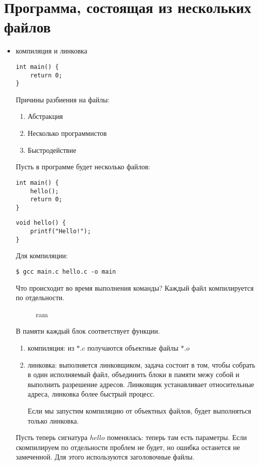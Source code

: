 % 
% 

\section{Программа, состоящая из нескольких файлов}
\begin{itemize}
    \item компиляция и линковка
\begin{lstlisting}[label=some-code,caption={main.c}]
int main() {
    return 0;
}
\end{lstlisting}
Причины разбиения на файлы:
\begin{enumerate}[noitemsep]
    \item Абстракция
    \item Несколько программистов
    \item Быстродействие
\end{enumerate}
 Пусть в программе будет несколько файлов:
\begin{lstlisting}[label=some-code,caption={main.c}]
int main() {
    hello();
    return 0;
}
\end{lstlisting}
\begin{lstlisting}[label=some-code,caption={hello.c}]
void hello() {
    printf("Hello!");
}
\end{lstlisting}
Для компиляции:
\begin{verbatim}
$ gcc main.c hello.c -o main
\end{verbatim}
Что происходит во время выполнения команды? Каждый файл компилируется по отдельности.
\begin{figure}[ht]
    \centering
    \caption{ram}
    \label{fig:ram}
\end{figure}
В памяти каждый блок соответствует функции.
\begin{enumerate}
    \item компиляция: из $*.c$ получаются объектные файлы $*.o$
    \item линковка: выполняется линковщиком, задача состоит в том, чтобы собрать в один исполняемый файл, объединить блоки в памяти межу собой и выполнить разрешение адресов.
	Линковщик устанавливает относительные адреса, линковка более быстрый процесс.

	Если мы запустим компиляцию от объектных файлов, будет выполняться только линковка.
\end{enumerate}

Пусть теперь сигнатура  $hello$ поменялась: теперь там есть параметры. Если скомпилируем по отдельности проблем не будет, но ошибка останется не замеченной. Для этого используются заголовочные файлы. 


\end{itemize}
